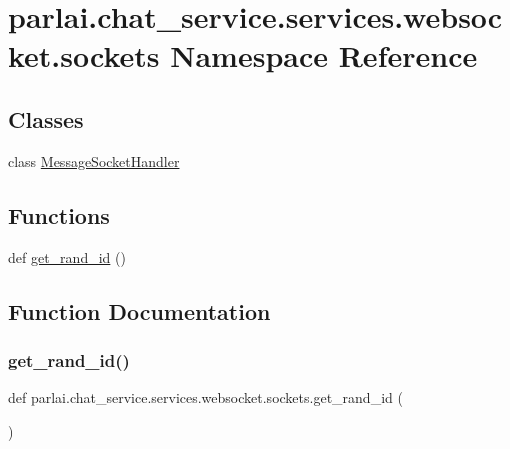 \hypertarget{namespaceparlai_1_1chat__service_1_1services_1_1websocket_1_1sockets}{}\section{parlai.\+chat\+\_\+service.\+services.\+websocket.\+sockets Namespace Reference}
\label{namespaceparlai_1_1chat__service_1_1services_1_1websocket_1_1sockets}
\subsection*{Classes}
\begin{DoxyCompactItemize}
\item 
class \hyperlink{classparlai_1_1chat__service_1_1services_1_1websocket_1_1sockets_1_1MessageSocketHandler}{Message\+Socket\+Handler}
\end{DoxyCompactItemize}
\subsection*{Functions}
\begin{DoxyCompactItemize}
\item 
def \hyperlink{namespaceparlai_1_1chat__service_1_1services_1_1websocket_1_1sockets_a474be2aef9361e19eacf308fbce1e802}{get\+\_\+rand\+\_\+id} ()
\end{DoxyCompactItemize}


\subsection{Function Documentation}
\mbox{\label{namespaceparlai_1_1chat__service_1_1services_1_1websocket_1_1sockets_a474be2aef9361e19eacf308fbce1e802}} 
\subsubsection{\texorpdfstring{get\+\_\+rand\+\_\+id()}{get\_rand\_id()}}
{\footnotesize\ttfamily def parlai.\+chat\+\_\+service.\+services.\+websocket.\+sockets.\+get\+\_\+rand\+\_\+id (\begin{DoxyParamCaption}{ }\end{DoxyParamCaption})}

